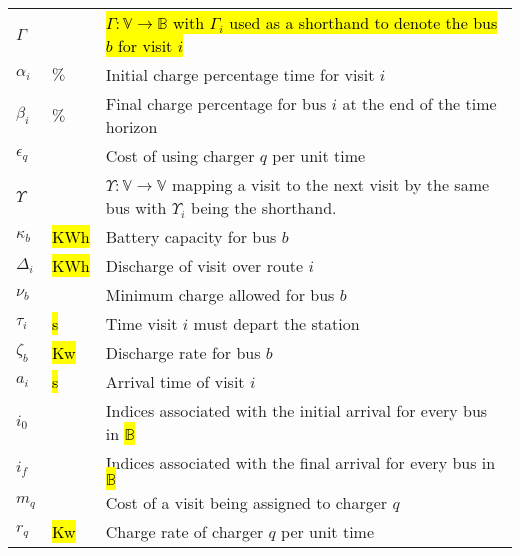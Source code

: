 \documentclass[utf8]{FrontiersinHarvard}
\begin{document}
\begin{table}[!htpb]
\begin{tabularx}{\textwidth}{l l l}
    \hline
    $\Gamma$          & & \hl{$\Gamma: \mathbb{V} \rightarrow \mathbb{B}$ with $\Gamma_i$ used as a shorthand to denote the bus $b$ for visit $i$}           \\
    $\alpha_i$        & $\%$ & Initial charge percentage time for visit $i$                                                              \\
    $\beta_i$        & $\%$ & Final charge percentage for bus $i$ at the end of the time horizon                                        \\
    $\epsilon_q$        & & Cost of using charger $q$ per unit time                                                                        \\
    $\Upsilon$          & & $\Upsilon: \mathbb{V} \rightarrow \mathbb{V}$ mapping a visit to the next visit by the same bus with $\Upsilon_i$ being the shorthand. \\
    $\kappa_b$        & \hl{KWh} & Battery capacity for bus $b$                                                                          \\
    $\Delta_i$        & \hl{KWh} & Discharge of visit over route $i$                                                                     \\
    $\nu_b$        & & Minimum charge allowed for bus $b$                                                                             \\
    $\tau_i$        & \hl{s} & Time visit $i$ must depart the station                                                                  \\
    $\zeta_b$        & \hl{Kw} & Discharge rate for bus $b$                                                                             \\
    $a_i$        & \hl{s} & Arrival time of visit  $i$                                                                              \\
    $i_0$        & & Indices associated with the initial arrival for every bus in \hl{$\mathbb{B}$}                                 \\
    $i_f$        & & Indices associated with the final arrival for every bus in \hl{$\mathbb{B}$}                                   \\
    $m_q$        & & Cost of a visit being assigned to charger $q$                                                                  \\
    $r_q$        & \hl{Kw} & Charge rate of charger $q$ per unit time                                                               \\

\end{tabularx}
\end{table}
\end{document}
